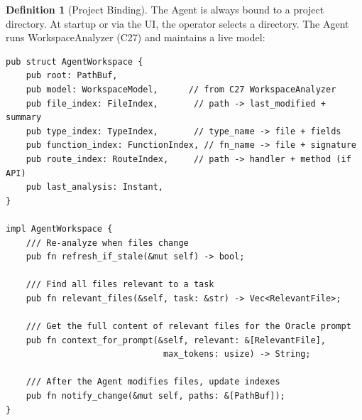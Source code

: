 \documentclass[11pt,a4paper,twoside]{article}
\theoremstyle{definition}
\newtheorem{definition}{Definition}[section]
\theoremstyle{remark}
\begin{document}
\begin{definition}[Project Binding]\label{def:projectbind}
The Agent is always bound to a project directory. At startup or
via the UI, the operator selects a directory. The Agent runs
WorkspaceAnalyzer (C27) and maintains a live model:

\begin{lstlisting}
pub struct AgentWorkspace {
    pub root: PathBuf,
    pub model: WorkspaceModel,      // from C27 WorkspaceAnalyzer
    pub file_index: FileIndex,       // path -> last_modified + summary
    pub type_index: TypeIndex,       // type_name -> file + fields
    pub function_index: FunctionIndex, // fn_name -> file + signature
    pub route_index: RouteIndex,     // path -> handler + method (if API)
    pub last_analysis: Instant,
}

impl AgentWorkspace {
    /// Re-analyze when files change
    pub fn refresh_if_stale(&mut self) -> bool;

    /// Find all files relevant to a task
    pub fn relevant_files(&self, task: &str) -> Vec<RelevantFile>;

    /// Get the full content of relevant files for the Oracle prompt
    pub fn context_for_prompt(&self, relevant: &[RelevantFile],
                               max_tokens: usize) -> String;

    /// After the Agent modifies files, update indexes
    pub fn notify_change(&mut self, paths: &[PathBuf]);
}
\end{lstlisting}
\end{definition}
\end{document}

